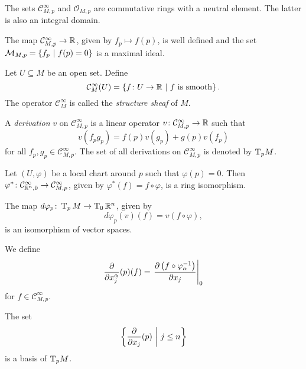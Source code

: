 \begin{opomba}
The sets $\mathcal{C}_{M,p}^\infty$ and $\mathcal{O}_{M,p}$ are
commutative rings with a neutral element. The latter is also an
integral domain.
\end{opomba}

\begin{opomba}
The map $\mathcal{C}_{M,p}^\infty \to \mathbb{R}$, given by
$f_p \mapsto f(p)$, is well defined and the set
$\mathcal{M}_{M,p} = \left\{f_p~\middle\vert~f(p) = 0\right\}$ is a maximal ideal.
\end{opomba}

\begin{definicija}
Let $U \subseteq M$ be an open set. Define
\[
\mathcal{C}_M^\infty(U) =
\left\{f \colon U \to \mathbb{R}~\middle\vert~\text{$f$ is smooth}\right\}.
\]
The operator $\mathcal{C}_M^\infty$ is called the
\emph{structure sheaf} of $M$.
\end{definicija}

\begin{definicija}
A \emph{derivation} $v$ on
$\mathcal{C}_{M,p}^\infty$ is a linear operator
$v \colon \mathcal{C}_{M,p}^\infty \to \mathbb{R}$ such that
\[
v(f_p g_p) = f(p) v(g_p) + g(p) v(f_p)
\]
for all $f_p, g_p \in \mathcal{C}_{M,p}^\infty$. The set of all
derivations on $\mathcal{C}_{M,p}^\infty$ is denoted by
$\operatorname{T}_p \! M$.
\end{definicija}

\begin{opomba}
Let $(U, \varphi)$ be a local chart around $p$ such that
$\varphi(p) = 0$. Then
$\varphi^* \colon
\mathcal{C}_{\mathbb{R}^n,0}^\infty \to \mathcal{C}_{M,p}^\infty$, given by
$\varphi^*(f) = f \circ \varphi$, is a ring isomorphism.
\end{opomba}

\begin{opomba}
The map $d \varphi_p \colon \operatorname{T}_p M \to \operatorname{T}_0 \mathbb{R}^n$, given
by
\[
d \varphi_p(v)(f) = v(f \circ \varphi),
\]
is an isomorphism of vector spaces.
\end{opomba}

\begin{definicija}
We define
\[
\frac{\partial }{\partial x_j^\alpha}(p)(f) =
\left. \frac{\partial \left(f \circ \varphi_\alpha^{-1}\right)}{\partial x_j}\right|_{0}^{}
\]
for $f \in \mathcal{C}_{M,p}^\infty$.
\end{definicija}

\begin{lema}
The set
\[
\left\{\frac{\partial }{\partial x_j}(p)~\middle\vert~j \leq n\right\}
\]
is a basis of $\operatorname{T}_p \! M$.
\end{lema}

